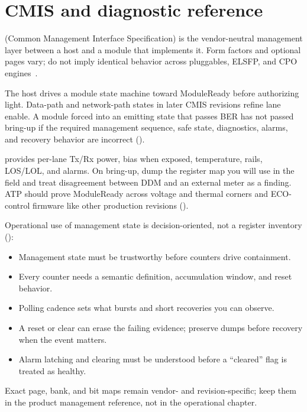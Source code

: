 \section{CMIS and diagnostic reference}
\label{sec:cmis}

 (Common Management Interface Specification) is the
vendor-neutral management layer between a host and a module that implements it.
Form factors and optional pages vary; do not imply identical behavior across
pluggables, ELSFP, and CPO engines~\cite{cmis53}.

The host drives a module state machine toward ModuleReady before authorizing
light. Data-path and network-path states in later CMIS revisions refine lane
enable. A module forced into an emitting state that passes BER has not passed
bring-up if the required management sequence, safe state, diagnostics, alarms,
and recovery behavior are incorrect ().

 provides per-lane Tx/Rx power, bias when exposed,
temperature, rails, LOS/LOL, and alarms. On bring-up, dump the register map you
will use in the field and treat disagreement between DDM and an external meter
as a finding. ATP should prove ModuleReady across voltage and thermal corners
and ECO-control firmware like other production revisions
().

Operational use of management state is decision-oriented, not a register
inventory ():

\begin{itemize}
\item Management state must be trustworthy before counters drive containment.
\item Every counter needs a semantic definition, accumulation window, and reset
      behavior.
\item Polling cadence sets what bursts and short recoveries you can observe.
\item A reset or clear can erase the failing evidence; preserve dumps before
      recovery when the event matters.
\item Alarm latching and clearing must be understood before a ``cleared'' flag
      is treated as healthy.
\end{itemize}

Exact page, bank, and bit maps remain vendor- and revision-specific; keep them
in the product management reference, not in the operational chapter.

